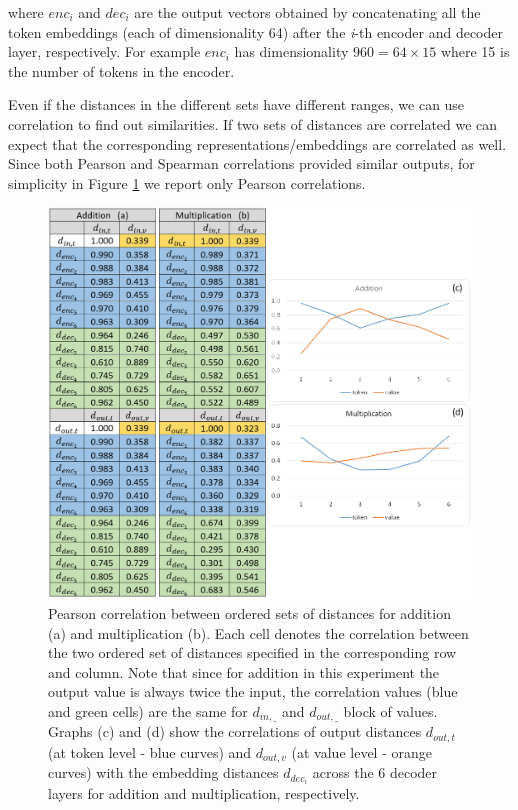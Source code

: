 \documentclass[final,1p,times,authoryear]{elsarticle}
\begin{document}
where $enc_i$ and $dec_i$ are the output vectors obtained by concatenating all the token embeddings (each of dimensionality 64) after the \textit{i}-th encoder and decoder layer, respectively. For example $enc_i$ has dimensionality $960 = 64 \times 15$ where 15 is the number of tokens in the encoder.

Even if the distances in the different sets have different ranges, we can use correlation to find out similarities. If two sets of distances are correlated we can expect that the corresponding representations/embeddings are correlated as well. Since both Pearson and Spearman correlations \citep{Schober2018} provided similar outputs, for simplicity in Figure \ref{figure:PearsonCorrelation} we report only Pearson correlations. 

\begin{figure}[!h]
\begin{center}
\includegraphics[scale=1.2]{PearsonCorrelation}
\end{center}
\caption{Pearson correlation between ordered sets of distances for addition (a) and multiplication (b). Each cell denotes the correlation between the two ordered set of distances specified in the corresponding row and column. Note that since for addition in this experiment the output value is always twice the input, the correlation values (blue and green cells) are the same for $d_{in,\_}$ and $d_{out,\_}$ block of values. Graphs (c) and (d) show the correlations of output distances $d_{out,t}$ (at token level - blue curves) and $d_{out,v}$ (at value level - orange curves) with the embedding distances $d_{dec_i}$ across the 6 decoder layers for addition and multiplication, respectively.}
\label{figure:PearsonCorrelation}
\end{figure}
\end{document}
